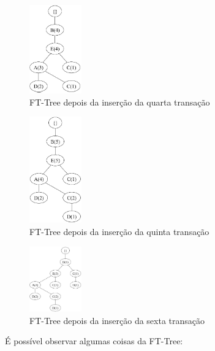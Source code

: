\documentclass[12pt]{article}
\begin{document}
\begin{figure}[H]
    \centering
    \includegraphics[width=0.2\textwidth]{t4.jpg}
    \caption{FT-Tree depois da inserção da quarta transação}
    \label{fig:apriori}
\end{figure}

\begin{figure}[H]
    \centering
    \includegraphics[width=0.2\textwidth]{t5.jpg}
    \caption{FT-Tree depois da inserção da quinta transação}
    \label{fig:apriori}
\end{figure}

\begin{figure}[H]
    \centering
    \includegraphics[width=0.2\textwidth]{t6.jpg}
    \caption{FT-Tree depois da inserção da sexta transação}
    \label{fig:apriori}
\end{figure}

É possível observar algumas coisas da FT-Tree:
\end{document}
